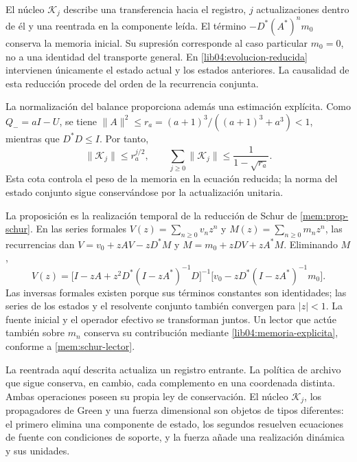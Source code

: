 El núcleo \(\mathscr K_j\) describe una transferencia hacia el registro,
\(j\) actualizaciones dentro de él y una reentrada en la componente leída.
El término \(-D^*(A^*)^nm_0\) conserva la memoria inicial. Su supresión
corresponde al caso particular \(m_0=0\), no a una identidad del transporte
general. En \eqref{lib04:evolucion-reducida} intervienen únicamente el
estado actual y los estados anteriores. La causalidad de esta reducción
procede del orden de la recurrencia conjunta.

La normalización del balance proporciona además una estimación explícita.
Como \(Q_-=aI-U\), se tiene
\(\|A\|^2\leq r_a=(a+1)^3/((a+1)^3+a^3)<1\), mientras que
\(D^*D\leq I\). Por tanto,
\begin{equation}
 \|\mathscr K_j\|\leq r_a^{j/2},\qquad
 \sum_{j\geq0}\|\mathscr K_j\|
 \leq\frac{1}{1-\sqrt{r_a}}.
 \label{lib04:cota-nucleo-retardo}
\end{equation}
Esta cota controla el peso de la memoria en la ecuación reducida; la norma
del estado conjunto sigue conservándose por la actualización unitaria.

La proposición es la realización temporal de la reducción de Schur de
\cref{mem:prop-schur}. En las series formales
\(V(z)=\sum_{n\geq0}v_nz^n\) y
\(M(z)=\sum_{n\geq0}m_nz^n\), las recurrencias dan
\(V=v_0+zAV-zD^*M\) y \(M=m_0+zDV+zA^*M\). Eliminando \(M\),
\begin{equation}
 V(z)=\bigl[I-zA+z^2D^*(I-zA^*)^{-1}D\bigr]^{-1}
       \bigl[v_0-zD^*(I-zA^*)^{-1}m_0\bigr].
 \label{lib04:schur-bilateral}
\end{equation}
Las inversas formales existen porque sus términos constantes son identidades;
las series de los estados y el resolvente conjunto también convergen para
\(|z|<1\). La fuente inicial y el operador efectivo se transforman juntos.
Un lector que actúe también sobre \(m_n\) conserva su contribución mediante
\eqref{lib04:memoria-explicita}, conforme a \eqref{mem:schur-lector}.

La reentrada aquí descrita actualiza un registro entrante. La política de
archivo que sigue conserva, en cambio, cada complemento en una coordenada
distinta. Ambas operaciones poseen su propia ley de conservación. El núcleo
\(\mathscr K_j\), los propagadores de Green y una fuerza dimensional son
objetos de tipos diferentes: el primero elimina una componente de estado,
los segundos resuelven ecuaciones de fuente con condiciones de soporte, y
la fuerza añade una realización dinámica y sus unidades.
